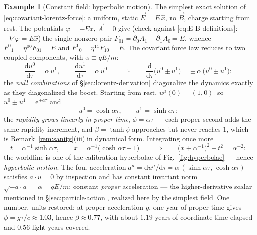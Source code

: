 \documentclass[11pt]{article}
\theoremstyle{plain}
\theoremstyle{definition}
\newtheorem{example}[theorem]{Example}
\theoremstyle{remark}
\newcommand{\dd}{\mathrm{d}}
\newcommand{\ee}{\mathrm{e}}
\newcommand{\tot}[2]{\frac{\dd #1}{\dd #2}}
\newcommand{\vE}{\vec{E}}
\newcommand{\vB}{\vec{B}}
\begin{document}
\begin{example}[Constant field: hyperbolic motion]\label{ex:hyperbolic}
The simplest exact solution of \eqref{eq:covariant-lorentz-force}: a
uniform, static $\vE = E\,\hat x$, no $\vB$, charge starting from rest.
The potentials $\varphi = -Ex$, $\vec A = 0$ give (check against
\eqref{eq:E-B-definitions}: $-\nabla\varphi = E\hat x$) the single
nonzero pair
$F_{01} = \partial_0 A_1 - \partial_1 A_0 = E$, whence
$F^0{}_1 = \eta^{00}F_{01} = E$ and
$F^1{}_0 = \eta^{11}F_{10} = E$. The covariant force law reduces to
two coupled components, with $\alpha \equiv qE/m$:
\begin{equation}
  \tot{u^0}{\tau} = \alpha\, u^1,
  \qquad
  \tot{u^1}{\tau} = \alpha\, u^0
  \qquad\Longrightarrow\qquad
  \tot{}{\tau}\bigl(u^0 \pm u^1\bigr) = \pm\,\alpha\,\bigl(u^0 \pm u^1\bigr):
\end{equation}
the \emph{null combinations} of \S\ref{sec:lorentz-derivation}
diagonalize the dynamics exactly as they diagonalized the boost.
Starting from rest, $u^\mu(0) = (1, 0)$, so $u^0 \pm u^1 =
\ee^{\pm\alpha\tau}$ and
\begin{equation}
  u^0 = \cosh\alpha\tau,
  \qquad
  u^1 = \sinh\alpha\tau :
\end{equation}
the \emph{rapidity grows linearly in proper time}, $\phi = \alpha\tau$
--- each proper second adds the same rapidity increment, and
$\beta = \tanh\phi$ approaches but never reaches $1$, which is
Remark~\ref{rem:sanity}(iii) in dynamical form. Integrating once more,
\begin{equation}
  t = \alpha^{-1}\sinh\alpha\tau,
  \qquad
  x = \alpha^{-1}\bigl(\cosh\alpha\tau - 1\bigr)
  \qquad\Longrightarrow\qquad
  \bigl(x + \alpha^{-1}\bigr)^2 - t^2 = \alpha^{-2} :
\end{equation}
the worldline is one of the calibration hyperbolae of
Fig.~\ref{fig:hyperbolae} --- hence \emph{hyperbolic motion}. The
four-acceleration $a^\mu = \dd u^\mu/\dd\tau =
\alpha\,(\sinh\alpha\tau,\, \cosh\alpha\tau)$ satisfies $a \cdot u = 0$
by inspection and has constant invariant norm
$\sqrt{-a\cdot a} = \alpha = qE/m$: constant \emph{proper}
acceleration --- the higher-derivative scalar mentioned in
\S\ref{sec:particle-action}, realized here by the simplest field. One
number, units restored: at proper acceleration $g$, one year of proper
time gives $\phi = g\tau/c \approx 1.03$, hence $\beta \approx 0.77$,
with about $1.19$ years of coordinate time elapsed and $0.56$
light-years covered.
\end{example}
\end{document}

